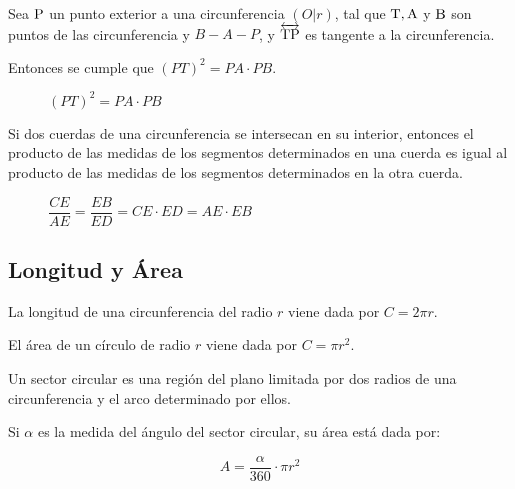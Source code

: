 \clearpage

\begin{theorem}

    Sea $\rm P$ un punto exterior a una circunferencia $(O|r)$, tal que $\rm T,A$ y $\rm B$ son puntos de las circunferencia y $B-A-P$, y $\overleftrightarrow{\rm TP}$ es tangente a la circunferencia.

    Entonces se cumple que $(PT)^2 = PA \cdot PB$.

    \begin{figure}[!h]
        \centering
        
        \caption{$(PT)^2 = PA \cdot PB$}
        \label{fig:plot721}
    \end{figure}

\end{theorem}


\begin{theorem}

Si dos cuerdas de una circunferencia se intersecan en su interior, entonces el producto de las medidas de los segmentos determinados en una cuerda es igual al producto de las medidas de los segmentos determinados en la otra cuerda.

    \begin{figure}[!h]
        \centering
        
        \caption{$\dfrac{CE}{AE}=\dfrac{EB}{ED} = CE \cdot ED = AE \cdot EB$}
        \label{fig:plot722}
    \end{figure}
    
\end{theorem}

\clearpage

\subsection{Longitud y Área}

\begin{theorem}
    La longitud de una circunferencia del radio $r$ viene dada por $C=2\pi r$.
\end{theorem}

\begin{theorem}
    El área de un círculo de radio $r$ viene dada por $C=\pi r^2$.
\end{theorem}

\begin{definition}
    Un sector circular es una región del plano limitada por dos radios de una circunferencia y el arco determinado por ellos.

    Si $\alpha$ es la medida del ángulo del sector circular, su área está dada por:

    $$A = \dfrac{\alpha}{360} \cdot \pi r^2$$
    
\end{definition}

